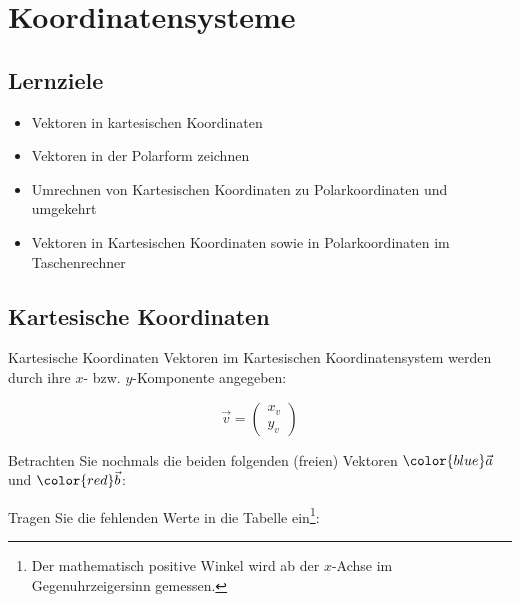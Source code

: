 
\section{Koordinatensysteme}



\subsection*{Lernziele}
\begin{itemize}
  \item Vektoren in kartesischen Koordinaten
\item Vektoren in der Polarform
  zeichnen
\item Umrechnen von Kartesischen Koordinaten zu Polarkoordinaten und
  umgekehrt
\item Vektoren in Kartesischen Koordinaten sowie in Polarkoordinaten
  im Taschenrechner 
\end{itemize}
\newpage

\subsection{Kartesische Koordinaten}


\begin{definition}{Kartesische Koordinaten}{}
  Vektoren im Kartesischen Koordinatensystem werden durch ihre $x$-
  bzw. $y$-Komponente angegeben:

  $$\vec{v} = \begin{pmatrix} x_v  \\ y_v \end{pmatrix}$$
\end{definition}

Betrachten Sie nochmals die beiden folgenden (freien) Vektoren ${\color{blue} \vec{a}}$ und
${\color{red}\vec{b}}$:


Tragen Sie die fehlenden Werte in die Tabelle ein\footnote{Der
  mathematisch positive Winkel wird ab der $x$-Achse im
  Gegenuhrzeigersinn gemessen.}:

